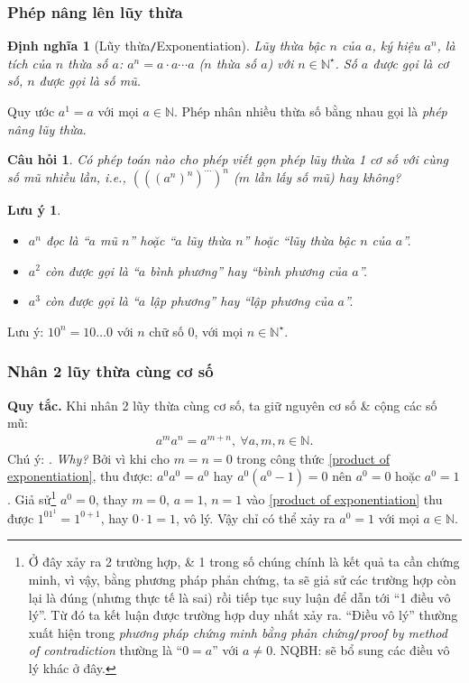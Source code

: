 \documentclass{article}
\numberwithin{equation}{section}
\newtheorem{definition}{Định nghĩa}[section]
\newtheorem{remark}{Lưu ý}[section]
\newtheorem{question}{Câu hỏi}[section]
\begin{document}
\subsubsection{Phép nâng lên lũy thừa}

\begin{definition}[Lũy thừa\texttt{/}Exponentiation]
	\emph{Lũy thừa bậc $n$} của $a$, ký hiệu $a^n$, là tích của $n$ thừa số $a$: $a^n = a\cdot a\cdots a$ ($n$ thừa số $a$) với $n\in\mathbb{N}^\star$. Số $a$ được gọi là \emph{cơ số}, $n$ được gọi là \emph{số mũ}.
\end{definition}
Quy ước $a^1 = a$ với mọi $a\in\mathbb{N}$. Phép nhân nhiều thừa số bằng nhau gọi là \textit{phép nâng lũy thừa}.

\begin{question}
	Có phép toán nào cho phép viết gọn phép lũy thừa 1 cơ số với cùng số mũ nhiều lần, i.e., $(((a^n)^n)^{\cdots})^n$ ($m$ lần lấy số mũ) hay không?
\end{question}

\begin{remark}
	\begin{itemize}
		\item $a^n$ đọc là ``$a$ mũ $n$'' hoặc ``$a$ lũy thừa $n$'' hoặc ``lũy thừa bậc $n$ của $a$''.
		\item $a^2$ còn được gọi là ``$a$ bình phương'' hay ``bình phương của $a$''.
		\item $a^3$ còn được gọi là ``$a$ lập phương'' hay ``lập phương của $a$''.
	\end{itemize}
\end{remark}
Lưu ý: $10^n = 10\ldots 0$ với $n$ chữ số 0, với mọi $n\in\mathbb{N}^\star$.

\subsubsection{Nhân 2 lũy thừa cùng cơ số}
\textbf{Quy tắc.} Khi nhân 2 lũy thừa cùng cơ số, ta giữ nguyên cơ số \& cộng các số mũ:
\begin{align}
	\label{product of exponentiation}
	\boxed{a^ma^n = a^{m+n},\ \forall a,m,n\in\mathbb{N}.}
\end{align}
Chú ý: . \textit{Why?} Bởi vì khi cho $m = n = 0$ trong công thức \eqref{product of exponentiation}, thu được: $a^0a^0 = a^0$ hay $a^0(a^0 - 1) = 0$ nên $a^0 = 0$ hoặc $a^0 = 1$. Giả sử\footnote{Ở đây xảy ra 2 trường hợp, \& 1 trong số chúng chính là kết quả ta cần chứng minh, vì vậy, bằng phương pháp phản chứng, ta sẽ giả sử các trường hợp còn lại là đúng (nhưng thực tế là sai) rồi tiếp tục suy luận để dẫn tới ``1 điều vô lý''. Từ đó ta kết luận được trường hợp duy nhất xảy ra. ``Điều vô lý'' thường xuất hiện trong \textit{phương pháp chứng minh bằng phản chứng}\texttt{/}\textit{proof by method of contradiction} thường là ``$0 = a$'' với $a\ne 0$. NQBH: sẽ bổ sung các điều vô lý khác ở đây.} $a^0 = 0$, thay $m = 0$, $a = 1$, $n = 1$ vào \eqref{product of exponentiation} thu được $1^01^1 = 1^{0+1}$, hay $0\cdot 1 = 1$, vô lý. Vậy chỉ có thể xảy ra $a^0 = 1$ với mọi $a\in\mathbb{N}$.
\end{document}
